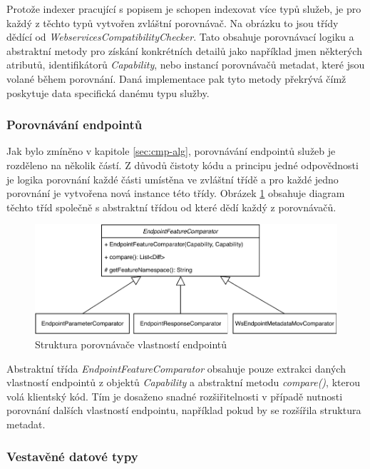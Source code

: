 \documentclass[czech,DP]{thesiskiv}
\begin{document}
Protože indexer pracující s popisem je schopen indexovat více typů služeb, je pro každý z těchto typů vytvořen zvláštní porovnávač. Na obrázku to jsou třídy dědící od \textit{WebservicesCompatibilityChecker}. Tato obsahuje porovnávací logiku a abstraktní metody pro získání konkrétních detailů jako například jmen některých atributů, identifikátorů \textit{Capability}, nebo instancí porovnávačů metadat, které jsou volané během porovnání. Daná implementace pak tyto metody překrývá čímž poskytuje data specifická danému typu služby.

\subsubsection{Porovnávání endpointů}

Jak bylo zmíněno v kapitole \ref{sec:cmp-alg}, porovnávání endpointů služeb je rozděleno na několik částí. Z důvodů čistoty kódu a principu jedné odpovědnosti je logika porovnání každé části umístěna ve zvláštní třídě a pro každé jedno porovnání je vytvořena nová instance této třídy. Obrázek \ref{fig:endpoint-cmp-uml-class} obsahuje diagram těchto tříd společně s abstraktní třídou od které dědí každý z porovnávačů. 

\begin{figure}[h]
	\centering
	\includegraphics[width=\linewidth]{endpoint-cmp-uml-class}
	\caption{Struktura porovnávače vlastností endpointů}
	\label{fig:endpoint-cmp-uml-class}
\end{figure}

Abstraktní třída \textit{EndpointFeatureComparator} obsahuje pouze extrakci daných vlastností endpointů z objektů \textit{Capability} a abstraktní metodu \textit{compare()}, kterou volá klientský kód. Tím je dosaženo snadné rozšiřitelnosti v případě nutnosti porovnání dalších vlastností endpointu, například pokud by se rozšířila struktura metadat. 

\subsubsection{Vestavěné datové typy}
\end{document}
